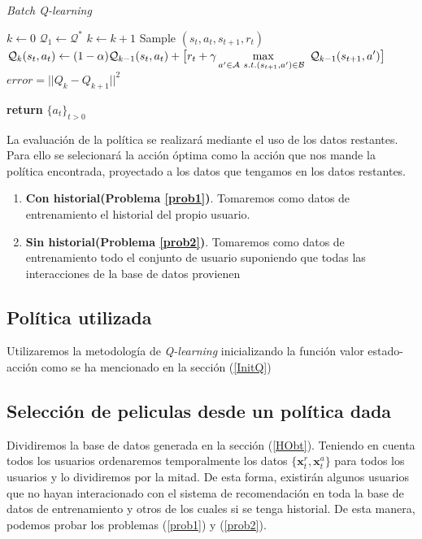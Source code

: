 \begin{algorithm}[!ht]
    \caption{\emph{Batch Q-learning }}\label{Qlearning}
    \begin{algorithmic}[1]
        \State $k \gets 0$
        \State $\mathcal{Q}_1 \gets \mathcal{Q}^{*}$
            \State $k \leftarrow k + 1$
            \State Sample $(s_t,a_t,s_{t+1},r_t)$
            \State $\displaystyle \mathcal{Q}_k(s_t,a_t) \gets (1-\alpha)\mathcal{Q}_{k-1}(s_t,a_t) +  
            \big[ r_t + \gamma \max_{a'\in \mathcal{A} \ s.t.(s_{t+1},a')  \in \mathcal{B} \ }\mathcal{Q}_{k-1}(s_{t+1},a') \big]$
            \State $error=|| Q_k - Q_{k+1}||^2$

        \EndWhile
        \State \textbf{return} $\{a_t\}_{t>0}$
        \EndProcedure
    \end{algorithmic}
\end{algorithm}


La evaluación de la política se realizará mediante el uso de los datos restantes. Para ello se selecionará la acción óptima como la acción que nos mande la política encontrada, proyectado a los datos que tengamos en los datos restantes.

\begin{enumerate}
    \item \textbf{Con historial(Problema \ref{prob1})}. Tomaremos como datos de entrenamiento el historial del propio usuario.
    \item \textbf{Sin historial(Problema \ref{prob2})}. Tomaremos como datos de entrenamiento todo el conjunto de usuario suponiendo que todas las interacciones de la base de datos provienen 
\end{enumerate}

\subsection{Política utilizada}

Utilizaremos la metodología de \emph{Q-learning} inicializando la función valor estado-acción como se ha mencionado en la sección (\ref{InitQ})


\subsection{Selección de peliculas  desde un política dada}

Dividiremos la base de datos generada en la sección (\ref{HObt}). Teniendo en cuenta todos los usuarios ordenaremos temporalmente los datos $\{\bm{x}_t^r,\bm{x}_t^a\}$  para todos los usuarios y lo dividiremos por la mitad. De esta forma, existirán algunos usuarios que no hayan interacionado con el sistema de recomendación en toda la base de datos de entrenamiento y otros de los cuales si se tenga historial. De esta manera, podemos probar los problemas (\ref{prob1}) y (\ref{prob2}).

